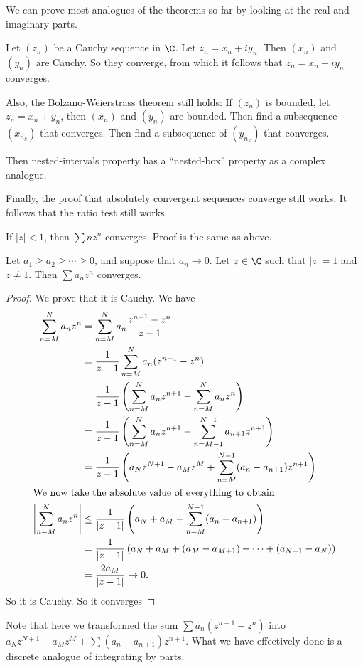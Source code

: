 \documentclass[a4paper]{article}
\begin{document}
We can prove most analogues of the theorems so far by looking at the real and imaginary parts.

\begin{eg}
  Let $(z_n)$ be a Cauchy sequence in $\C$. Let $z_n = x_n+ iy_n$. Then $(x_n)$ and $(y_n)$ are Cauchy. So they converge, from which it follows that $z_n = x_n + iy_n$ converges.
\end{eg}

Also, the Bolzano-Weierstrass theorem still holds: If $(z_n)$ is bounded, let $z_n = x_n + y_n$, then $(x_n)$ and $(y_n)$ are bounded. Then find a subsequence $(x_{n_k})$ that converges. Then find a subsequence of $(y_{n_k})$ that converges.

Then nested-intervals property has a ``nested-box'' property as a complex analogue.

Finally, the proof that absolutely convergent sequences converge still works. It follows that the ratio test still works.

\begin{eg}
  If $|z| < 1$, then $\sum nz^n$ converges. Proof is the same as above.
\end{eg}

\begin{lemma}
  Let $a_1 \geq a_2 \geq \cdots \geq 0$, and suppose that $a_n \to 0$. Let $z\in \C$ such that $|z| = 1$ and $z \not= 1$. Then $\sum a_n z^n$ converges.
\end{lemma}

\begin{proof}
  We prove that it is Cauchy. We have
  \begin{align*}
    \sum_{n = M}^N a_n z^n &= \sum_{n = M}^N a_n\frac{z^{n + 1} - z^n}{z - 1}\\
    &= \frac{1}{z - 1}\sum_{n = M}^N a_n (z^{n + 1} - z^n)\\
    &= \frac{1}{z - 1}\left(\sum_{n = M}^N a_n z^{n + 1} - \sum_{n = M}^N a_n z^n\right)\\
    &= \frac{1}{z - 1}\left(\sum_{n = M}^N a_n z^{n + 1} - \sum_{n = M - 1}^{N - 1} a_{n + 1} z^{n + 1}\right)\\
    &= \frac{1}{z - 1}\left(a_N z^{N + 1} - a_M z^M + \sum_{n = M}^{N - 1} (a_n - a_{n + 1})z^{n + 1}\right)\\
    \intertext{We now take the absolute value of everything to obtain}
    \left|\sum_{n = M}^N a_nz^n\right| &\leq \frac{1}{|z - 1|} \left(a_N + a_M + \sum_{n = M}^{N - 1}(a_n - a_{n + 1})\right)\\
    &= \frac{1}{|z - 1|}\left(a_N + a_M + (a_M - a_{M + 1}) + \cdots + (a_{N - 1} - a_{N})\right)\\
    &= \frac{2a_M}{|z - 1|} \to 0.
  \end{align*}
  So it is Cauchy. So it converges
\end{proof}
Note that here we transformed the sum $\sum a_n(z^{n + 1} - z^n)$ into $a_N z^{N + 1} - a_M z^M + \sum (a_n - a_{n + 1})z^{n + 1}$. What we have effectively done is a discrete analogue of integrating by parts.
\end{document}
